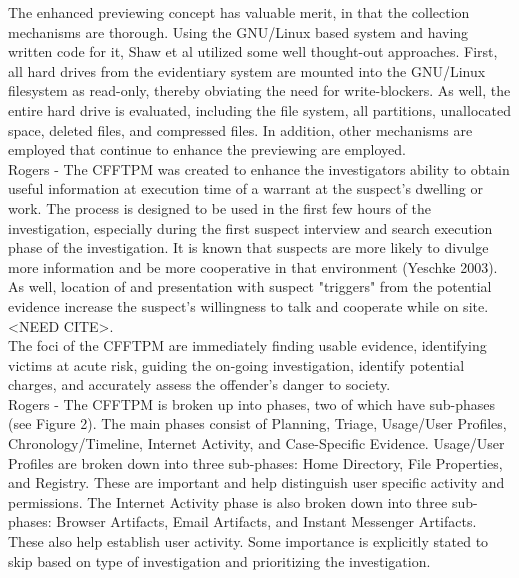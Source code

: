 \documentclass[12pt]{article}
\begin{document}
The enhanced previewing concept has valuable merit, in that the collection mechanisms are thorough.  Using the
GNU/Linux based system and having written code for it, Shaw et al\cite{shaw2013practical} utilized some well
thought-out approaches.  First, all hard drives from the evidentiary system are mounted into the GNU/Linux
filesystem as read-only, thereby obviating the need for write-blockers.  As well, the entire hard drive is
evaluated, including the file system, all partitions, unallocated space, deleted files, and compressed files.  In
addition, other mechanisms are employed that continue to enhance the previewing are employed.\\

Rogers - The CFFTPM was created to enhance the investigators ability to obtain useful information at execution time of a 
warrant at the suspect's dwelling or work.  The process is designed to be used in the first few hours of the 
investigation, especially during the first suspect interview and search execution phase of the investigation.  It is
known that suspects are more likely to divulge more information and be more cooperative in that environment (Yeschke
2003\cite{yeschke2003art}).  As well, location of and presentation with suspect "triggers" from the potential evidence
increase the suspect's willingness to talk and cooperate while on site. <NEED CITE>.\\

The foci of the CFFTPM are immediately finding usable evidence, identifying victims at acute risk, guiding the
on-going investigation, identify potential charges, and accurately assess the offender's danger to society.\\

Rogers - The CFFTPM is broken up into phases, two of which have sub-phases (see Figure 2).  The main phases consist of Planning, Triage,
Usage/User Profiles, Chronology/Timeline, Internet Activity, and Case-Specific Evidence.   Usage/User Profiles are broken down into three sub-phases:
Home Directory, File Properties, and Registry.  These are important and help distinguish user specific activity and
permissions.  The Internet Activity phase is also broken down into three sub-phases: Browser Artifacts, Email
Artifacts, and Instant Messenger Artifacts.  These also help establish user activity.  Some importance is explicitly
stated to skip based on type of investigation and prioritizing the investigation.\\ 
\end{document}
